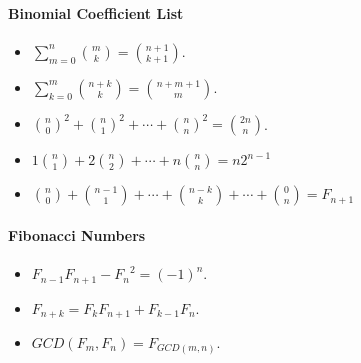 \paragraph{Binomial Coefficient List}
\begin{itemize}
    \item $\sum_{m = 0}^n \binom m k = \binom {n + 1} {k + 1} $.
    \item $\sum_{k = 0}^m \binom {n + k} k = \binom {n + m + 1} m$.
    \item ${\binom n 0}^2 + {\binom n 1}^2 + \cdots + {\binom n n}^2 = \binom {2n} n$.
    \item $1 \binom n 1 + 2 \binom n 2 + \cdots + n \binom n n = n 2^{n-1} $
    \item $\binom n 0 + \binom {n-1} 1 + \cdots + \binom {n-k} k + \cdots + \binom 0 n = F_{n+1} $
\end{itemize}

\paragraph{Fibonacci Numbers}
\begin{itemize}
	\item $F_{n-1}F_{n+1} - {F_n}^2 = {(-1)}^n $.
	\item $F_{n+k} = F_kF_{n+1} + F_{k-1}F_n$.
	\item $GCD(F_m,F_n) = F_{GCD(m,n)}$.
\end{itemize}